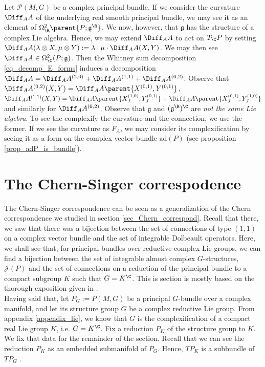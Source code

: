 \begin{obs}
    Let \(\mathcal{P}(M,G)\) be a complex principal bundle. If we consider the curvature \(\Diff_AA\) of the underlying real smooth principal bundle, we may see it as an element of \(\Omega_\R^2\parent{P; \mathfrak{g}^\R}\). We now, however, that \(\mathfrak{g}\) has the structure of a complex Lie algebra. Hence, we may extend \(\Diff_AA\) to act on \(T_\C P\) by setting \(\Diff_A A(\lambda \otimes X, \mu \otimes Y):=\lambda \cdot \mu \cdot \Diff_A A(X,Y)\). We may then see \(\Diff_A A\in \Omega_\C^2(P; \mathfrak{g})\). Then the Whitney sum decomposition \eqref{eq_decomp_E_forms} induces a decomposition \(\Diff_A A=\Diff_A A^{(2,0)}+\Diff_A A^{(1,1)}+\Diff_A A^{(0,2)}\). Observe that \(\Diff_A A^{(0,2)}(X,Y)=\Diff_A A\parent{X^{(0,1)}, Y^{(0,1)}}\), \(\Diff_A A^{(1,1)}(X,Y)=\Diff_A A\parent{X^{(1,0)}_J,Y^{(0,1)}_J}+\Diff_A A\parent{X_J^{(0,1)}, Y_J^{(1,0)}}\) and similarly for \(\Diff_A A^{(0,2)}\). {\color{red} Observe that \(\mathfrak{g}\) and \((\mathfrak{g}^\R)^\C\) are \textit{not the same Lie algebra}. To see the complexify the curvature and the connection, we use the former.} If we see the curvature as \(F_A\), we may consider its complexification by seeing it as a form on the complex vector bundle \(\mathrm{ad}(P)\) (see proposition \ref{prop_adP_is_bundle}). 
\end{obs}

\section{The Chern-Singer correspodence} \label{section_Chern_Singer_correspondence}
The Chern-Singer correspondence can be seen as a generalization of the Chern correspondence we studied in section \ref{sec_Chern_correspond}. Recall that there, we saw that there was a bijection between the set of connections of type \((1,1)\) on a complex vector bundle and the set of integrable Dolbeault operators. Here, we shall see that, for principal bundles over reductive complex Lie groups, we can find a bijection between the set of integrable almost complex \(G\)-structures, \(\mathscr{J}(P)\) and the set of connections on a reduction of the principal bundle to a compact subgroup \(K\) such that \(G=K^\C\). This is section is mostly based on the thorough exposition given in \parencite{Sandon_Chern_Correspondence}. \\

Having said that, let \(P_G:=P(M,G)\) be a principal \(G\)-bundle over a complex manifold, and let its structure group \(G\) be a complex reductive Lie group. From appendix \ref{appendix_lie}, we know that \(G\) is the complexification of a compact real Lie group \(K\), i.e. \(G=K^\C\). Fix a reduction \(P_K\) of the structure group to \(K\). We fix that data for the remainder of the section. Recall that we can see the reduction \(P_K\) as an embedded submanifold of \(P_G\). Hence, \(TP_K\) is a subbundle of \(TP_G\) \parencite[Example 10.33-(c)]{lee_introSM}.

